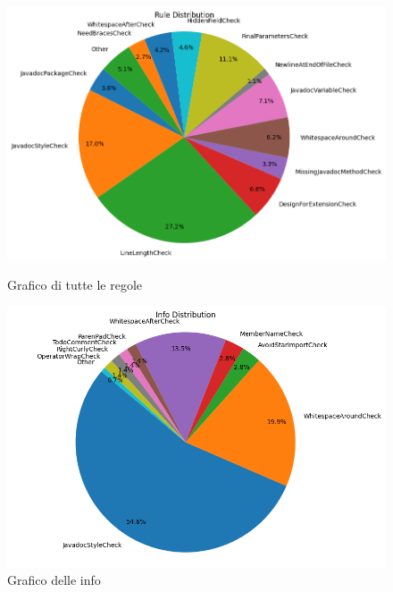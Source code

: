 \begin{figure}[H]
	\centering
	\begin{minipage}[b]{1\textwidth}
		\centering
		\includegraphics[width=\textwidth]{iterazione1/images/comanda-error_distribution_pie_chart.png}
		\caption{Grafico di tutte le regole}
		\label{fig:comanda-error_distribution_pie_chart}
	\end{minipage}
	\hfill
	\begin{minipage}[b]{0.45\textwidth}
		\centering
		\includegraphics[width=\textwidth]{iterazione1/images/comanda-info_severity_distribution_pie_chart.png}
		\caption{Grafico delle info}
		\label{fig:comanda-info_severity_distribution_pie_chart}
	\end{minipage}
	\vspace{0.5cm}
	\begin{minipage}[b]{0.45\textwidth}
		\centering

\end{minipage}
\end{figure}
